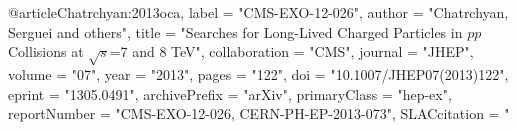 @article{Chatrchyan:2013oca,
      label          = "CMS-EXO-12-026",
      author         = "Chatrchyan, Serguei and others",
      title          = "{Searches for Long-Lived Charged Particles in $pp$
                        Collisions at $\sqrt{s}$=7 and 8 TeV}",
      collaboration  = "CMS",
      journal        = "JHEP",
      volume         = "07",
      year           = "2013",
      pages          = "122",
      doi            = "10.1007/JHEP07(2013)122",
      eprint         = "1305.0491",
      archivePrefix  = "arXiv",
      primaryClass   = "hep-ex",
      reportNumber   = "CMS-EXO-12-026, CERN-PH-EP-2013-073",
      SLACcitation   = "%
}

